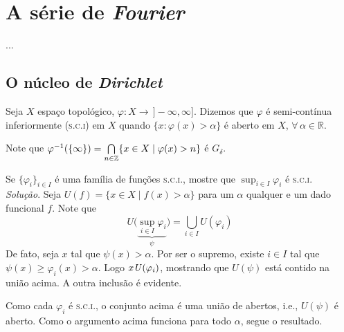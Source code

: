 \documentclass[../main.tex]{subfiles}
\begin{document}
\chapter{A série de \textit{Fourier}}
...

\section{O núcleo de \textit{Dirichlet}}

\begin{definicao}
Seja $X$ espaço topológico, $\varphi: X \longrightarrow \,]-\infty, \infty]$. Dizemos que $\varphi$ é semi-contínua inferiormente (\textsc{s.c.i}) em $X$ quando $\{x: \varphi(x)>\alpha\}$ é aberto em $X$, $\forall \,\alpha \in \mathbb{R}$.
\end{definicao}

Note que $\varphi^{-1}(\{\infty\}) = \bigcap\limits_{n\in \operatorname{\mathbb{Z}}} \{ x\in X \mid \varphi(x)>n\}$ é $G_\delta$.

\begin{exercicio}
Se $\{\varphi_i\}_{i \in I}$ é uma família de funções \textsc{s.c.i.}, mostre que $\sup _{i \in I} \varphi_i$ é \textsc{s.c.i.}\\
\textit{Solução}. Seja $U(f) = \{x\in X \mid f(x) > \alpha\}$ para um $\alpha$ qualquer e um dado funcional $f$. Note que 
$$U\Big(\underbrace{\sup_{i \in I} \varphi_i}_{\psi}\Big) = \bigcup_{i \in I} U(\varphi_i)$$
De fato, seja $x$ tal que $\psi(x) > \alpha$. Por ser o supremo, existe $i\in I$ tal que $\psi(x) \geqslant \varphi_i(x) > \alpha$. Logo $x\it U(\varphi_i)$, mostrando que $U(\psi)$ está contido na união acima. A outra inclusão é evidente.

Como cada $\varphi_i$ é \textsc{s.c.i.}, o conjunto acima é uma união de abertos, i.e., $U(\psi)$ é aberto. Como o argumento acima funciona para todo $\alpha$, segue o resultado. 
\end{exercicio}
\end{document}

